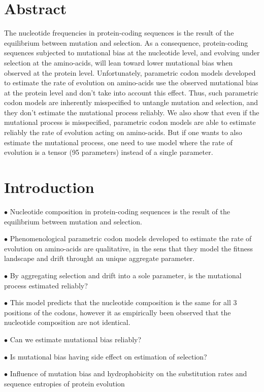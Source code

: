 \section{Abstract}

The nucleotide frequencies in protein-coding sequences is the result of the equilibrium between mutation and selection.
As a consequence, protein-coding sequences subjected to mutational bias at the nucleotide level, and evolving under selection at the amino-acids, will lean toward lower mutational bias when observed at the protein level.
Unfortunately, parametric \gls{codon} models developed to estimate the rate of evolution on amino-acids use the observed mutational bias at the protein level and don't take into account this effect.
Thus, such parametric \gls{codon} models are inherently misspecified to untangle mutation and selection, and they don’t estimate the mutational process reliably.
We also show that even if the mutational process is misspecified, parametric \gls{codon} models are able to estimate reliably the rate of evolution acting on amino-acids.
But if one wants to also estimate the mutational process, one need to use model where the rate of evolution is a tensor (95 parameters) instead of a single parameter.


\section{Introduction}

$\bullet$ Nucleotide composition in protein-coding sequences is the result of the equilibrium between mutation and selection.

$\bullet$ Phenomenological parametric \gls{codon} models developed to estimate the rate of evolution on amino-acids are qualitative, in the sens that they model the fitness landscape and drift throught an unique aggregate parameter.

$\bullet$ By aggregating selection and drift into a sole parameter, is the mutational process estimated reliably?

$\bullet$ This model predicts that the nucleotide composition is the same for all $3$ positions of the \glspl{codon}, however it as empirically been observed that the nucleotide composition are not identical.

$\bullet$ Can we estimate mutational bias reliably?

$\bullet$ Is mutational bias having side effect on estimation of selection?

$\bullet$ Influence of mutation bias and hydrophobicity on the \gls{substitution} rates and sequence entropies of protein evolution \citet{Santos2018}

